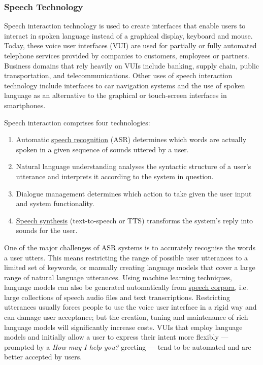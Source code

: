 \begin{multicols}{2}
\subsubsection{Speech Technology}


Speech interaction technology is used to create interfaces that enable users to interact in spoken language instead of a graphical display, keyboard and mouse. Today, these voice user interfaces (VUI) are used for partially or fully automated telephone services provided by companies to customers, employees or partners. Business domains that rely heavily on VUIs include banking, supply chain, public transportation, and telecommunications. Other uses of speech interaction technology include interfaces to car navigation systems and the use of spoken language as an alternative to the graphical or touch-screen interfaces in smartphones. 

Speech interaction comprises four technologies: 
\begin{enumerate}
\item Automatic \uline{speech recognition} (ASR) determines which words are actually spoken in a given sequence of sounds uttered by a user.
\item Natural language understanding analyses the syntactic structure of a user’s utterance and interprets it according to the system in question.
\item Dialogue management determines which action to take given the user input and system functionality.
\item \uline{Speech synthesis} (text-to-speech or TTS) transforms the system’s reply into sounds for the user. 
\end{enumerate}

One of the major challenges of ASR systems is to accurately recognise the words a user utters. This means restricting the range of possible user utterances to a limited set of keywords, or manually creating language models that cover a large range of natural language utterances. Using machine learning techniques, language models can also be generated automatically from \uline{speech corpora}, i.e. large collections of speech audio files and text transcriptions. Restricting utterances usually forces people to use the voice user interface in a rigid way and can damage user acceptance; but the creation, tuning and maintenance of rich language models will significantly increase costs. VUIs that employ language models and initially allow a user to express their intent more flexibly — prompted by a \textit{How may I help you?} greeting — tend to be automated and are better accepted by users. 


\end{multicols}
